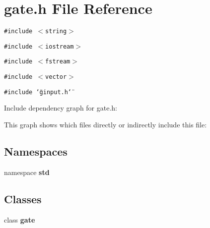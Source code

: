 \section{gate.h File Reference}
\label{gate_8h}
{\tt \#include $<$string$>$}\par
{\tt \#include $<$iostream$>$}\par
{\tt \#include $<$fstream$>$}\par
{\tt \#include $<$vector$>$}\par
{\tt \#include \char`\"{}ginput.h\char`\"{}}\par


Include dependency graph for gate.h:

This graph shows which files directly or indirectly include this file:\subsection*{Namespaces}
\begin{CompactItemize}
\item 
namespace \bf{std}
\end{CompactItemize}
\subsection*{Classes}
\begin{CompactItemize}
\item 
class \bf{gate}
\end{CompactItemize}
